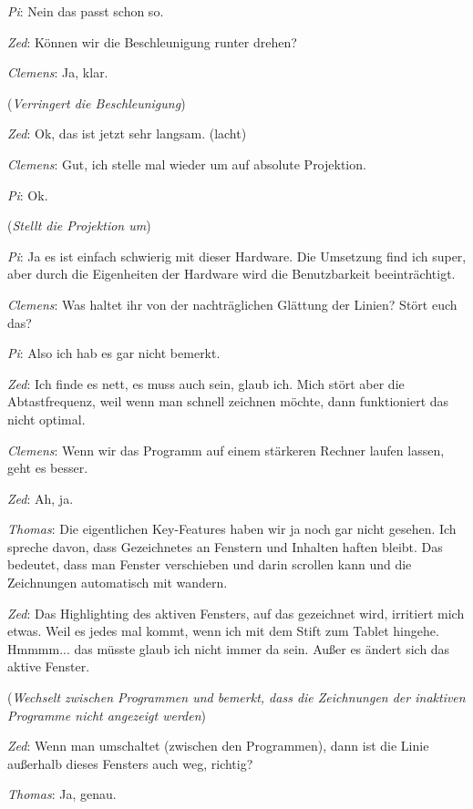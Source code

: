 \medskip \emph{Pi}: Nein das passt schon so.

\medskip \emph{Zed}: Können wir die Beschleunigung runter drehen?

\medskip \emph{Clemens}: Ja, klar.

\medskip (\emph{Verringert die Beschleunigung})

\medskip \emph{Zed}: Ok, das ist jetzt sehr langsam. (lacht)

\medskip \emph{Clemens}: Gut, ich stelle mal wieder um auf absolute Projektion.

\medskip \emph{Pi}: Ok.

\medskip (\emph{Stellt die Projektion um})

\medskip \emph{Pi}: Ja es ist einfach schwierig mit dieser Hardware. Die Umsetzung find ich super, aber durch die Eigenheiten der Hardware wird die Benutzbarkeit beeinträchtigt.

\medskip \emph{Clemens}: Was haltet ihr von der nachträglichen Glättung der Linien? Stört euch das?

\medskip \emph{Pi}: Also ich hab es gar nicht bemerkt.

\medskip \emph{Zed}: Ich finde es nett, es muss auch sein, glaub ich. Mich stört aber die Abtastfrequenz, weil wenn man schnell zeichnen möchte, dann funktioniert das nicht optimal.

\medskip \emph{Clemens}: Wenn wir das Programm auf einem stärkeren Rechner laufen lassen, geht es besser.

\medskip \emph{Zed}: Ah, ja.

\medskip \emph{Thomas}: Die eigentlichen Key-Features haben wir ja noch gar nicht gesehen. Ich spreche davon, dass Gezeichnetes an Fenstern und Inhalten haften bleibt. Das bedeutet, dass man Fenster verschieben und darin scrollen kann und die Zeichnungen automatisch mit wandern.

\medskip \emph{Zed}: Das Highlighting des aktiven Fensters, auf das gezeichnet wird, irritiert mich etwas. Weil es jedes mal kommt, wenn ich mit dem Stift zum Tablet hingehe. Hmmmm... das müsste glaub ich nicht immer da sein. Außer es ändert sich das aktive Fenster. 

\medskip (\emph{Wechselt zwischen Programmen und bemerkt, dass die Zeichnungen der inaktiven Programme nicht angezeigt werden})

\medskip \emph{Zed}: Wenn man umschaltet (zwischen den Programmen), dann ist die Linie außerhalb dieses Fensters auch weg, richtig?

\medskip \emph{Thomas}: Ja, genau.

